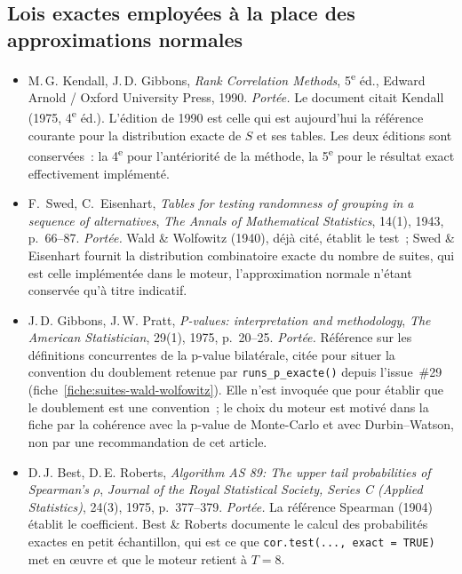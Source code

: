 \documentclass[a4paper,11pt]{article}
\newcommand{\code}[1]{\texttt{\small #1}}
\begin{document}
\subsection*{Lois exactes employées à la place des approximations normales}

\begin{itemize}[itemsep=4pt]
  \item M.\,G. Kendall, J.\,D. Gibbons, \emph{Rank Correlation Methods},
  5\textsuperscript{e} éd., Edward Arnold / Oxford University Press, 1990.
  \emph{Portée.} Le document citait Kendall (1975,
  4\textsuperscript{e} éd.). L'édition de 1990 est celle qui est aujourd'hui
  la référence courante pour la distribution exacte de $S$ et ses tables. Les
  deux éditions sont conservées~: la 4\textsuperscript{e} pour l'antériorité de
  la méthode, la 5\textsuperscript{e} pour le résultat exact effectivement
  implémenté.

  \item F.~Swed, C.~Eisenhart, \emph{Tables for testing randomness of grouping
  in a sequence of alternatives}, \emph{The Annals of Mathematical Statistics},
  14(1), 1943, p.~66--87.
  \emph{Portée.} Wald \& Wolfowitz (1940), déjà cité, établit le
  test~; Swed \& Eisenhart fournit la distribution combinatoire exacte du
  nombre de suites, qui est celle implémentée dans le moteur, l'approximation
  normale n'étant conservée qu'à titre indicatif.

  \item J.\,D. Gibbons, J.\,W. Pratt, \emph{P-values: interpretation and
  methodology}, \emph{The American Statistician}, 29(1), 1975, p.~20--25.
  \emph{Portée.} Référence sur les définitions concurrentes de la p-value
  bilatérale, citée pour situer la convention du doublement retenue par
  \code{runs\_p\_exacte()} depuis l'issue~\#29
  (fiche~\ref{fiche:suites-wald-wolfowitz}). Elle n'est invoquée que pour
  établir que le doublement est une convention~; le choix du moteur est motivé
  dans la fiche par la cohérence avec la p-value de Monte-Carlo et avec
  Durbin--Watson, non par une recommandation de cet article.

  \item D.\,J. Best, D.\,E. Roberts, \emph{Algorithm AS 89: The upper tail
  probabilities of Spearman's $\rho$}, \emph{Journal of the Royal Statistical
  Society, Series C (Applied Statistics)}, 24(3), 1975, p.~377--379.
  \emph{Portée.} La référence Spearman (1904) établit le
  coefficient. Best \& Roberts documente le calcul des probabilités exactes en
  petit échantillon, qui est ce que \code{cor.test(..., exact = TRUE)} met en
  \oe uvre et que le moteur retient à $T = 8$.


\end{itemize}
\end{document}
